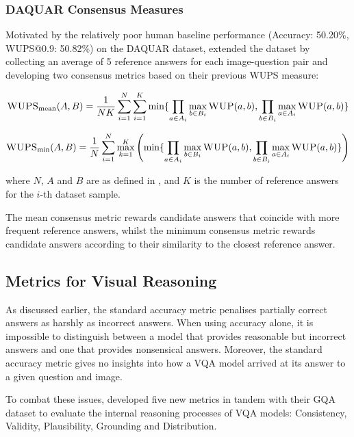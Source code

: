 \subsubsection{DAQUAR Consensus Measures}

Motivated by the relatively poor human baseline performance (Accuracy: 50.20\%, WUPS@0.9:  50.82\%) on the DAQUAR dataset, \citeauthor{malinowski2015ask} extended the dataset by collecting an average of 5 reference answers for each image-question pair and developing two consensus metrics based on their previous WUPS measure:

\begin{equation}
    \textsc{WUPS}_{\text{mean}}(A, B) =     \frac{1}{NK} \sum_{i=1}^N \sum_{i=1}^K \min \{\prod_{a \in A_i} \max_{b \in B_i} \textsc{WUP}(a, b), \prod_{b \in B_i} \max_{a \in A_i} \textsc{WUP}(a, b)\}
    \label{equation:wups_mean_consensus}
\end{equation}


\begin{equation}
    \textsc{WUPS}_{\text{min}}(A, B) =     \frac{1}{N} \sum_{i=1}^N \max_{k=1}^K \left( \min \{\prod_{a \in A_i} \max_{b \in B_i} \textsc{WUP}(a, b), \prod_{b \in B_i} \max_{a \in A_i} \textsc{WUP}(a, b)\} \right)
    \label{equation:wups_min_consensus}
\end{equation}

where \(N\), \(A\) and \(B\) are as defined in \equationautorefname{ \ref{equation:wups}}, and \(K\) is the number of reference answers for the \(i\)-th dataset sample.

The mean consensus metric rewards candidate answers that coincide with more frequent reference answers, whilst the minimum consensus metric rewards candidate answers according to their similarity to the closest reference answer.

\subsection{Metrics for Visual Reasoning}

As discussed earlier, the standard accuracy metric penalises partially correct answers as harshly as incorrect answers. When using accuracy alone, it is impossible to distinguish between a model that provides reasonable but incorrect answers and one that provides nonsensical answers. Moreover, the standard accuracy metric gives no insights into how a VQA model arrived at its answer to a given question and image.

To combat these issues, \citeauthor{hudson2019gqa} developed five new metrics in tandem with their GQA dataset \cite{hudson2019gqa} to evaluate the internal reasoning processes of VQA models: Consistency, Validity, Plausibility, Grounding and Distribution.

